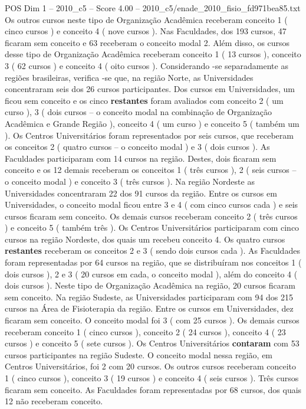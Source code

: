 \begin{textsample}{POS Dim 1 – 2010\_c5 – Score 4.00 – 2010\_c5/enade\_2010\_fisio\_fd971bea85.txt}
Os outros cursos neste tipo de Organização Acadêmica receberam conceito 1 ( cinco cursos ) e conceito 4 ( nove cursos ).
Nas Faculdades, dos 193 cursos, 47 ficaram sem conceito e 63 receberam o conceito modal 2.
Além disso, os cursos desse tipo de Organização Acadêmica receberam conceito 1 ( 13 cursos ), conceito 3 ( 62 cursos ) e conceito 4 ( oito cursos ).
Considerando -se separadamente as regiões brasileiras, verifica -se que, na região Norte, as Universidades concentraram seis dos 26 cursos participantes.
Dos cursos em Universidades, um ficou sem conceito e os cinco \textbf{restantes} foram avaliados com conceito 2 ( um curso ), 3 ( dois cursos – o conceito modal na combinação de Organização Acadêmica e Grande Região ), conceito 4 ( um curso ) e conceito 5 ( também um ).
Os Centros Universitários foram representados por seis cursos, que receberam os conceitos 2 ( quatro cursos – o conceito modal ) e 3 ( dois cursos ).
As Faculdades participaram com 14 cursos na região.
Destes, dois ficaram sem conceito e os 12 demais receberam os conceitos 1 ( três cursos ), 2 ( seis cursos – o conceito modal ) e conceito 3 ( três cursos ).
Na região Nordeste as Universidades concentraram 22 dos 91 cursos da região.
Entre os cursos em Universidades, o conceito modal ficou entre 3 e 4 ( com cinco cursos cada ) e seis cursos ficaram sem conceito.
Os demais cursos receberam conceito 2 ( três cursos ) e conceito 5 ( também três ).
Os Centros Universitários participaram com cinco cursos na região Nordeste, dos quais um recebeu conceito 4.
Os quatro cursos \textbf{restantes} receberam os conceitos 2 e 3 ( sendo dois cursos cada ).
As Faculdades foram representadas por 64 cursos na região, que se distribuíram nos conceitos 1 ( dois cursos ), 2 e 3 ( 20 cursos em cada, o conceito modal ), além do conceito 4 ( dois cursos ).
Neste tipo de Organização Acadêmica na região, 20 cursos ficaram sem conceito.
Na região Sudeste, as Universidades participaram com 94 dos 215 cursos na Área de Fisioterapia da região.
Entre os cursos em Universidades, dez ficaram sem conceito.
O conceito modal foi 3 ( com 25 cursos ).
Os demais cursos receberam conceito 1 ( cinco cursos ), conceito 2 ( 24 cursos ), conceito 4 ( 23 cursos ) e conceito 5 ( sete cursos ).
Os Centros Universitários \textbf{contaram} com 53 cursos participantes na região Sudeste.
O conceito modal nessa região, em Centros Universitários, foi 2 com 20 cursos.
Os outros cursos receberam conceito 1 ( cinco cursos ), conceito 3 ( 19 cursos ) e conceito 4 ( seis cursos ).
Três cursos ficaram sem conceito.
As Faculdades foram representadas por 68 cursos, dos quais 12 não receberam conceito.

\end{textsample}
